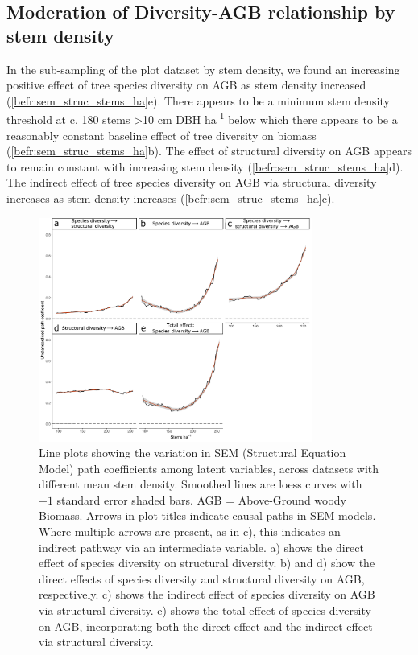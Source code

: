 \begin{refsection}
\subsection{Moderation of Diversity-AGB relationship by stem density}
\label{befr:ssec:stems}

In the sub-sampling of the plot dataset by stem density, we found an increasing positive effect of tree species diversity on AGB as stem density increased (\autoref{befr:sem_struc_stems_ha}e). There appears to be a minimum stem density threshold at c. 180 stems >10 cm DBH ha\textsuperscript{-1} below which there appears to be a reasonably constant baseline effect of tree diversity on biomass (\autoref{befr:sem_struc_stems_ha}b). The effect of structural diversity on AGB appears to remain constant with increasing stem density (\autoref{befr:sem_struc_stems_ha}d). The indirect effect of tree species diversity on AGB via structural diversity increases as stem density increases (\autoref{befr:sem_struc_stems_ha}c). 

\begin{figure}[tb]
\centering
	\includegraphics[width=0.8\textwidth]{img/sem_struc_stems_ha}
	\caption[Effect of stems density on path coefficients]{Line plots showing the variation in SEM (Structural Equation Model) path coefficients among latent variables, across datasets with different mean stem density. Smoothed lines are loess curves with $\pm1$ standard error shaded bars. AGB = Above-Ground woody Biomass. Arrows in plot titles indicate causal paths in SEM models. Where multiple arrows are present, as in c), this indicates an indirect pathway via an intermediate variable. a) shows the direct effect of species diversity on structural diversity. b) and d) show the direct effects of species diversity and structural diversity on AGB, respectively. c) shows the indirect effect of species diversity on AGB via structural diversity. e) shows the total effect of species diversity on AGB, incorporating both the direct effect and the indirect effect via structural diversity.}
	\label{befr:sem_struc_stems_ha}
\end{figure}


\end{refsection}
